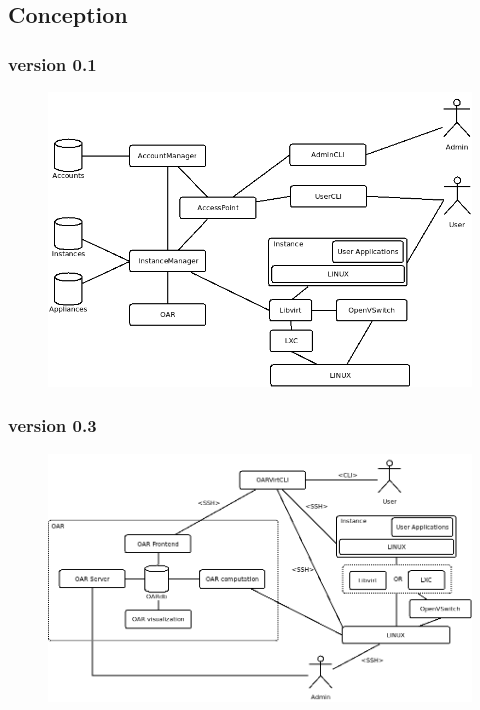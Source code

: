 \documentclass{beamer}
\begin{document}
		\subsection{Conception}
			\begin{frame}
				\frametitle{version 0.1}
				\begin{figure}
			    \includegraphics[scale=0.33]{img/DiagLogic_0_1.png}
 			  \end{figure}
			\end{frame}
			\begin{frame}
				\frametitle{version 0.3}
				\begin{figure}
			    \includegraphics[scale=0.3]{img/DiagLogic_0_3.png}
 			  \end{figure}
			\end{frame}
		
\end{document}
